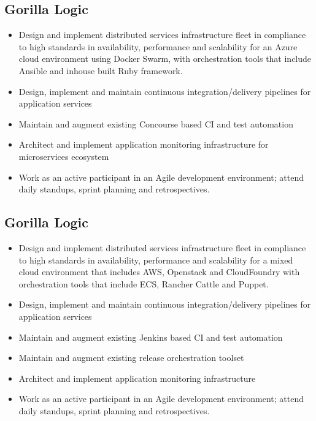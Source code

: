 \documentclass[11pt,a4paper,sans]{moderncv}   %
\begin{document}
\subsection{Gorilla Logic}
\begin{itemize}
  \item Design and implement distributed services infrastructure fleet in compliance to high standards in availability, performance and scalability for an Azure cloud environment using Docker Swarm, with orchestration tools that include Ansible and inhouse built Ruby framework.
  \item Design, implement and maintain continuous integration/delivery pipelines for application services
  \item Maintain and augment existing Concourse based CI and test automation
  \item Architect and implement application monitoring infrastructure for microservices ecosystem
  \item Work as an active participant in an Agile development environment; attend daily standups, sprint planning and retrospectives.
\end{itemize}
\subsection{Gorilla Logic}
\begin{itemize}
  \item Design and implement distributed services infrastructure fleet in compliance to high standards in availability, performance and scalability for a mixed cloud environment that includes AWS, Openstack and CloudFoundry with orchestration tools that include ECS, Rancher Cattle and Puppet.
  \item Design, implement and maintain continuous integration/delivery pipelines for application services
  \item Maintain and augment existing Jenkins based CI and test automation
  \item Maintain and augment existing release orchestration toolset
  \item Architect and implement application monitoring infrastructure
  \item Work as an active participant in an Agile development environment; attend daily standups, sprint planning and retrospectives.
\end{itemize}
\end{document}
